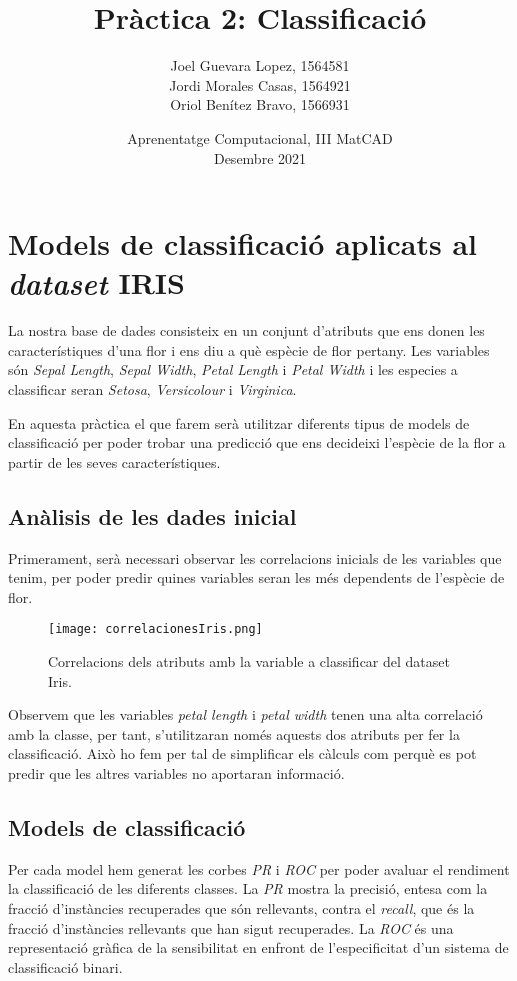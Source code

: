 \documentclass[a4paper, 11pt]{article}
\title{\Huge{\textbf{Pràctica 2: Classificació}}}
\author{\Large{Joel Guevara Lopez, 1564581}
        \\\Large{Jordi Morales Casas, 1564921}
        \\\Large{Oriol Benítez Bravo, 1566931}}
\date{Aprenentatge Computacional, III MatCAD\\ \vspace{6pt} Desembre 2021}
\begin{document}
    \maketitle

    \section{Models de classificació aplicats al \textit{dataset} IRIS}

    La nostra base de dades consisteix en un conjunt d'atributs que ens donen les característiques
    d'una flor i ens diu a què espècie de flor pertany. Les variables són \textit{Sepal Length},
    \textit{Sepal Width}, \textit{Petal Length} i \textit{Petal Width} i les especies a classificar
    seran \textit{Setosa}, \textit{Versicolour} i \textit{Virginica}.

    En aquesta pràctica el que farem serà utilitzar diferents tipus de models de classificació per
    poder trobar una predicció que ens decideixi l'espècie de la flor a partir de les seves
    característiques.

    \newpage
    \subsection{Anàlisis de les dades inicial}

    Primerament, serà necessari observar les correlacions inicials de les variables que tenim, per poder predir quines variables seran les més dependents de l'espècie de flor.

    \begin{figure}[H]
        \centering
        \texttt{[image: correlacionesIris.png]}
        \caption{Correlacions dels atributs amb la variable a classificar del dataset Iris.}
    \end{figure}

    Observem que les variables \textit{petal length} i \textit{petal width} tenen una alta correlació amb la classe, per tant, s'utilitzaran només aquests dos atributs per fer la classificació. Això ho fem per tal de simplificar els càlculs com perquè es pot predir que les altres variables no aportaran informació.

    \newpage
    \subsection{Models de classificació}

    Per cada model hem generat les corbes \textit{PR} i \textit{ROC} per poder avaluar el rendiment la classificació de les diferents classes. La \textit{PR} mostra la precisió, entesa com la fracció d'instàncies recuperades que són rellevants, contra el \textit{recall}, que és la fracció d'instàncies rellevants que han sigut recuperades. La \textit{ROC} és una representació gràfica de la sensibilitat en enfront de l'especificitat d'un sistema de classificació binari.
\end{document}
